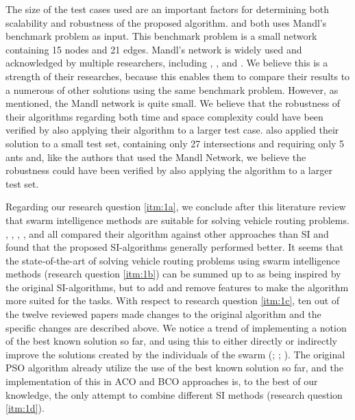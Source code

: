 The size of the test cases used are an important factors for determining both scalability and robustness of the proposed algorithm. \citet{nikolic14} and \citet{kechagiopoulos14} both uses Mandl's benchmark problem as input. This benchmark problem is a small network containing 15 nodes and 21 edges.  Mandl's network is widely used and acknowledged by multiple researchers, including \citet{baaj91}, \citet{chakroborty02}, and \citet{fan09}. We believe this is a strength of their researches, because this enables them to compare their results to a numerous of other solutions using the same benchmark problem. However, as mentioned, the Mandl network is quite small. We believe that the robustness of their algorithms regarding both time and space complexity could have been verified by also applying their algorithm to a larger test case.\citet{salehi-nezhad07} also applied their solution to a small test set, containing only 27 intersections and requiring only 5 ants and, like the authors that used the Mandl Network, we believe the robustness could have been verified by also applying the algorithm to a larger test set.  \newline

Regarding our research question \ref{itm:1a}, we conclude after this literature review that swarm intelligence methods are suitable for solving vehicle routing problems. \citet{tripathi09}, \citet{dias14}, \citet{poorzahedy11}, \citet{nikolic14}, and \citet{kechagiopoulos14} all compared their algorithm against other approaches than SI and found that the proposed SI-algorithms generally performed better. It seems that the state-of-the-art of solving vehicle routing problems using swarm intelligence methods (research question \ref{itm:1b}) can be summed up to as being inspired by the original SI-algorithms, but to add and remove features to make the algorithm more suited for the tasks. With respect to research question \ref{itm:1c}, ten out of the twelve reviewed papers made changes to the original algorithm and the specific changes are described above. We notice a trend of implementing a notion of the best known solution so far, and using this to either directly or indirectly improve the solutions created by the individuals of the swarm (\citet{tripathi09}; \citet{sedighpour14}; \citet{nikolic14}). The original PSO algorithm already utilize the use of the best known solution so far, and the implementation of this in ACO and BCO approaches is, to the best of our knowledge, the only attempt to combine different SI methods (research question \ref{itm:1d}). 